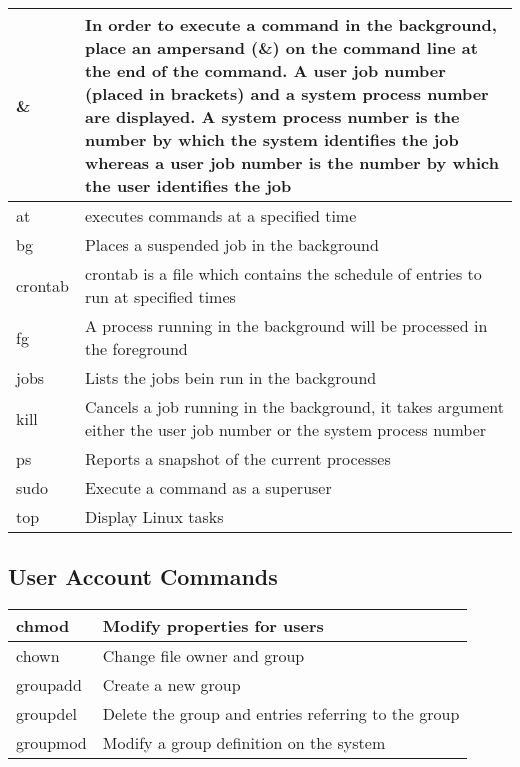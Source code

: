 \begin{tabular}{|p{}|p{}|} \hline
\&      & In order to execute a command in the background, place an ampersand (\&) on the command line at the end of the command. A user job number (placed in brackets) and a system process number are displayed. A system process number is the number by which the system identifies the job whereas a user job number is the number by which the user identifies the job \\ \hline
at      & executes commands at a specified time \\ \hline
bg      & Places a suspended job in the background \\ \hline
crontab & crontab is a file which contains the schedule of entries to run at specified times \\ \hline
fg      & A process running in the background will be processed in the foreground \\ \hline
jobs    & Lists the jobs bein run in the background \\ \hline
kill    & Cancels a job running in the background, it takes argument either the user job number or the system process number \\ \hline
ps      & Reports a snapshot of the current processes \\ \hline
sudo    & Execute a command as a superuser \\ \hline
top     & Display Linux tasks \\ \hline
\end{tabular}


\subsection{User Account Commands}

\begin{tabular}{|p{}|p{}|} \hline
chmod    & Modify properties for users \\ \hline
chown    & Change file owner and group \\ \hline
groupadd & Create a new group \\ \hline
groupdel & Delete the group and entries referring to the group \\ \hline
groupmod & Modify a group definition on the system \\ \hline
\end{tabular}

